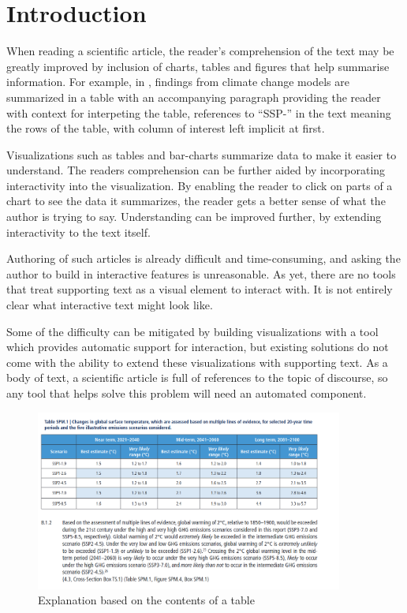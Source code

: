 \section{Introduction}

When reading a scientific article, the reader's comprehension of the text may
be greatly improved by inclusion of charts, tables and figures that help summarise information.
For example, in , findings from climate change models
are summarized in a table with an accompanying paragraph providing the reader
with context for interpeting the table, references to ``SSP-'' in the text meaning
the rows of the table, with column of interest left implicit at first.

Visualizations such as tables and bar-charts summarize data to make it easier to
understand. The readers comprehension can be further aided by incorporating 
interactivity into the visualization. By enabling the reader to click on parts
of a chart to see the data it summarizes, the reader gets a better sense of what
the author is trying to say. Understanding can be improved further, by extending
interactivity to the text itself.

Authoring of such articles is already difficult and time-consuming, and asking
the author to build in interactive features is unreasonable. As yet, there are
no tools that treat supporting text as a visual element to interact with. It is
not entirely clear what interactive text might look like. 

Some of the difficulty can be mitigated by building visualizations with a tool
which provides automatic support for interaction, but existing solutions do
not come with the ability to extend these visualizations with supporting text.
As a body of text, a scientific article is full of references to the topic of
discourse, so any tool that helps solve this problem will need an automated
component.

\begin{figure}
   \includegraphics[width=0.9\textwidth]{fig/ipcc-table-explanation.png}
   \caption{Explanation based on the contents of a table}
   \label{fig:table-explanation}
\end{figure}